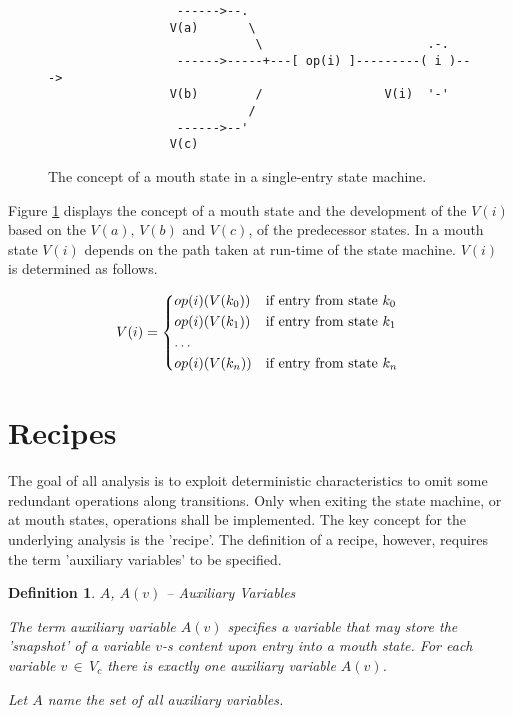 \documentclass[12pt,a4paper]{scrartcl}
\newtheorem{definition}{Definition}
\begin{document}
\begin{figure}[htbp] \leavevmode \label{fig:mouth-state}
\begin{verbatim}
                  ------>--.  
                 V(a)       \ 
                             \                       .-.
                  ------>-----+---[ op(i) ]---------( i )---> 
                 V(b)        /                 V(i)  '-'
                            /
                  ------>--'
                 V(c)

\end{verbatim}
\caption{The concept of a mouth state in a single-entry state machine.}
\end{figure}

Figure \ref{fig:mouth-state} displays the concept of a mouth state and the
development of the $V(i)$ based on the $V(a),\,V(b)$ and $V(c)$, of the
predecessor states. In a mouth state $V(i)$ depends on the path taken at
run-time of the state machine.  $V(i)$ is determined as follows.

\begin{equation} \label{eq:interference}
    V(i) = \begin{dcases*}
            op(i)(V(k_0)) & if entry from state $k_0$ \\
            op(i)(V(k_1)) & if entry from state $k_1$ \\
            \ldots \\
            op(i)(V(k_n)) & if entry from state $k_n$ \\
            \end{dcases*}
\end{equation}


%
\section{Recipes}

The goal of all analysis is to exploit deterministic characteristics to omit some
redundant operations along transitions.  Only when exiting the state
machine, or at mouth states, operations shall be implemented. The key concept
for the underlying analysis is the 'recipe'. The definition of a recipe,
however, requires the term 'auxiliary variables' to be specified.

\begin{definition} $A$, $A(v)$ -- Auxiliary Variables

The term auxiliary variable $A(v)$ specifies a variable that may store the
'snapshot' of a variable $v$-s content upon entry into a mouth state. For each
variable $v\,\in\,V_c$ there is exactly one auxiliary variable $A(v)$.
   
Let $A$ name the set of all auxiliary variables.
\end{definition}
\end{document}
